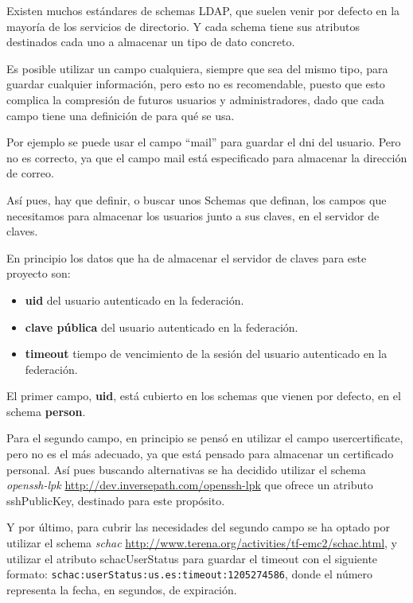     Existen muchos estándares de schemas LDAP, que suelen venir por defecto
    en la mayoría de los servicios de directorio. Y cada schema tiene sus
    atributos destinados cada uno a almacenar un tipo de dato concreto.

    Es posible utilizar un campo cualquiera, siempre que sea del mismo
    tipo, para guardar cualquier información, pero esto no es recomendable,
    puesto que esto complica la compresión de futuros usuarios y
    administradores, dado que cada campo tiene una definición de para qué
    se usa.

    Por ejemplo se puede usar el campo ``mail'' para guardar el dni del
    usuario. Pero no es correcto, ya que el campo mail está especificado
    para almacenar la dirección de correo.

    Así pues, hay que definir, o buscar unos Schemas que definan, los
    campos que necesitamos para almacenar los usuarios junto a sus claves,
    en el servidor de claves.

    En principio los datos que ha de almacenar el servidor de claves para
    este proyecto son:

    \begin{itemize}

    \item \textbf{uid} del usuario autenticado en la federación.
    \item \textbf{clave pública} del usuario autenticado en la federación.
    \item \textbf{timeout} tiempo de vencimiento de la sesión del usuario autenticado en la federación.

    \end{itemize}

    El primer campo, \textbf{uid}, está cubierto en los schemas que vienen
    por defecto, en el schema \textbf{person}.

    Para el segundo campo, en principio se pensó en utilizar el campo
    usercertificate, pero no es el más adecuado, ya que está pensado para
    almacenar un certificado personal. Así pues buscando alternativas se ha
    decidido utilizar el schema \textit{openssh-lpk}
    \url{http://dev.inversepath.com/openssh-lpk} que ofrece un atributo
    sshPublicKey, destinado para este propósito.

    Y por último, para cubrir las necesidades del segundo campo se ha
    optado por utilizar el schema \textit{schac}
    \url{http://www.terena.org/activities/tf-emc2/schac.html}, y utilizar
    el atributo schacUserStatus para guardar el timeout con el siguiente
    formato: \texttt{schac:userStatus:us.es:timeout:1205274586}, donde el
    número representa la fecha, en segundos, de expiración.

